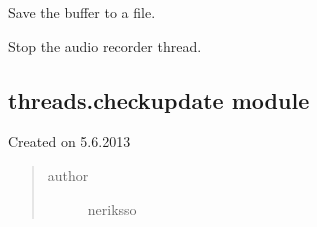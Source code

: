 \documentclass[letterpaper,10pt,english]{sphinxmanual}
\begin{document}
\begin{fulllineitems}
\begin{fulllineitems}
\label{threads:threads.audiorecorder.AudioRecorder.save}
Save the buffer to a file.

\end{fulllineitems}


\begin{fulllineitems}
\label{threads:threads.audiorecorder.AudioRecorder.stop}
Stop the audio recorder thread.

\end{fulllineitems}


\end{fulllineitems}



\subsection{threads.checkupdate module}
\label{threads:threads-checkupdate-module}\label{threads:module-threads.checkupdate}
Created on 5.6.2013
\begin{quote}\begin{description}
\item[{author}] \leavevmode
neriksso

\end{description}\end{quote}
\end{document}

